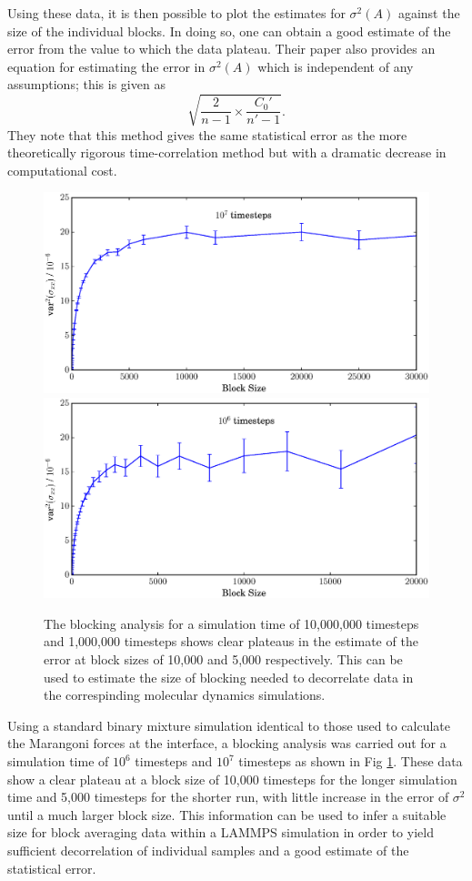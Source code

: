 Using these data, it is then possible to plot the estimates for $\sigma^{2}(A)$ against the size of the individual blocks.
In doing so, one can obtain a good estimate of the error from the value to which the data plateau.
Their paper also provides an equation for estimating the error in $\sigma^{2}(A)$ which is independent of any assumptions; this is given as
$$\sqrt{\frac{2}{n-1} \times \frac{C_{0}'}{n'-1}}.$$
They note that this method gives the same statistical error as the more theoretically rigorous time-correlation method but with a dramatic decrease in computational cost.

\begin{figure}
        \includegraphics[scale=0.35]{block_average_10e6.eps}
        \includegraphics[scale=0.35]{block_average_1e6.eps}
	\caption{The blocking analysis for a simulation time of 10,000,000 timesteps and 1,000,000 timesteps shows clear plateaus in the estimate of the error at block sizes of 10,000 and 5,000 respectively.
This can be used to estimate the size of blocking needed to decorrelate data in the correspinding molecular dynamics simulations.}
\label{blocking}
\end{figure}

Using a standard binary mixture simulation identical to those used to calculate the Marangoni forces at the interface, a blocking analysis was carried out for a simulation time of $10^{6}$ timesteps and $10^{7}$ timesteps as shown in Fig \ref{blocking}.
These data show a clear plateau at a block size of 10,000 timesteps for the longer simulation time and 5,000 timesteps for the shorter run, with little increase in the error of $\sigma^{2}$ until a much larger block size.
This information can be used to infer a suitable size for block averaging data within a LAMMPS simulation in order to yield sufficient decorrelation of individual samples and a good estimate of the statistical error. 


